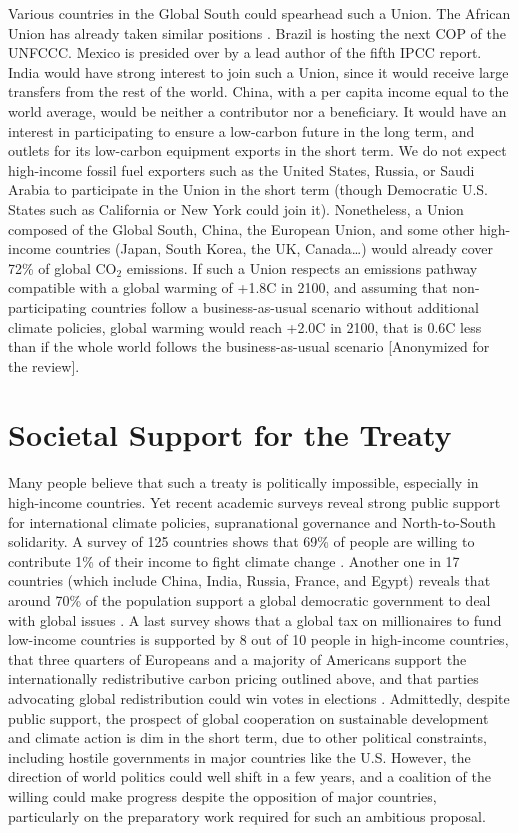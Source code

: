 \documentclass[12pt,english]{article}
\begin{document}
\begin{bibunit}
Various countries in the Global South could spearhead such a Union. The African Union has already taken similar positions \citep{african_union_african_2023}. Brazil is hosting the next COP of the UNFCCC. Mexico is presided over by a lead author of the fifth IPCC report. India would have strong interest to join such a Union, since it would receive large transfers from the rest of the world. China, with a per capita income equal to the world average, would be neither a contributor nor a beneficiary. It would have an interest in participating to ensure a low-carbon future in the long term, and outlets for its low-carbon equipment exports in the short term. We do not expect high-income fossil fuel exporters such as the United States, Russia, or Saudi Arabia to participate in the Union in the short term (though Democratic U.S. States such as California or New York could join it). Nonetheless, a Union composed of the Global South, China, the European Union, and some other high-income countries (Japan, South Korea, the UK, Canada…) would already cover 72\% of global CO$_\text{2}$ emissions. If such a Union respects an emissions pathway compatible with a global warming of +1.8\textdegree{}C in 2100, and assuming that non-participating countries follow a business-as-usual scenario without additional climate policies, global warming would reach +2.0\textdegree{}C in 2100, that is 0.6\textdegree{}C less than if the whole world follows the business-as-usual scenario [Anonymized for the review].%

\section{Societal Support for the Treaty}
Many people believe that such a treaty is politically impossible, especially in high-income countries. Yet recent academic surveys reveal strong public support for international climate policies, supranational governance and North-to-South solidarity. A survey of 125 countries shows that 69\% of people are willing to contribute 1\% of their income to fight climate change \citep{andre_globally_2024}. Another one in 17 countries (which include China, India, Russia, France, and Egypt) reveals that around 70\% of the population support a global democratic government to deal with global issues \citep{ghassim_who_2024}. A last survey shows that a global tax on millionaires to fund low-income countries is supported by 8 out of 10 people in high-income countries, that three quarters of Europeans and a majority of Americans support the internationally redistributive carbon pricing outlined above, and that parties advocating global redistribution could win votes in elections \citep{fabre_majority_2025}. Admittedly, despite public support, the prospect of global cooperation on sustainable development and climate action is dim in the short term, due to other political constraints, including hostile governments in major countries like the U.S. However, the direction of world politics could well shift in a few years, and a coalition of the willing could make progress despite the opposition of major countries, particularly on the preparatory work required for such an ambitious proposal. 


\end{bibunit}
\end{document}
